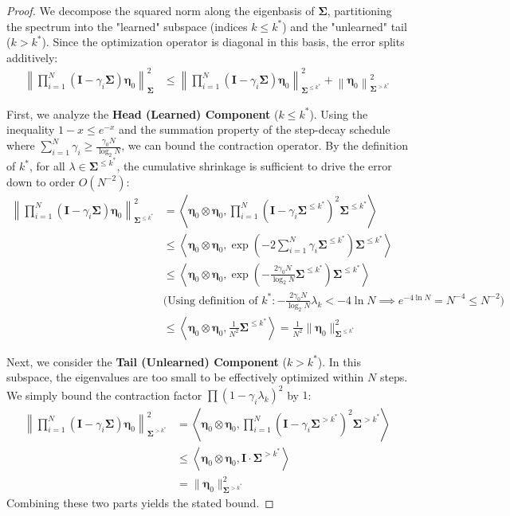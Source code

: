 \documentclass{article}
\theoremstyle{definition}
\theoremstyle{definition}
\theoremstyle{plain}
\theoremstyle{plain}
\theoremstyle{plain}
\theoremstyle{plain}
\theoremstyle{plain}
\newcommand{\bs}[1]{\boldsymbol{\mathbf{#1}}}
\newcommand{\Sig}{\mathbf{\Sigma}}
\newcommand{\id}{\mathbf{I}}
\newcommand{\nm}[2][]{\left\| #2 \right\|^2_{#1}}
\newcommand{\inner}[1]{\left\langle#1\right\rangle}
\begin{document}
\begin{proof}
    We decompose the squared norm along the eigenbasis of $\bs\Sigma$, partitioning the spectrum into the "learned" subspace (indices $k \le k^*$) and the "unlearned" tail ($k > k^*$). Since the optimization operator is diagonal in this basis, the error splits additively:
    \begin{equation}
    \begin{aligned}
        \nm[\Sig]{\prod_{i=1}^N(\id-\gamma_i\bs\Sigma)\bs\eta_0} &\leq \nm[\Sig^{\leq k^*}]{\prod_{i=1}^N(\id-\gamma_i\bs\Sigma)\bs\eta_0} + \nm[\Sig^{>k^*}]{\bs\eta_0}
    \end{aligned}
    \end{equation}

    First, we analyze the \textbf{Head (Learned) Component} ($k \leq k^*$). Using the inequality $1-x \le e^{-x}$ and the summation property of the step-decay schedule where $\sum_{i=1}^N \gamma_i \ge \frac{\gamma_0 N}{\log_2 N}$, we can bound the contraction operator. By the definition of $k^*$, for all $\lambda \in \Sig^{\le k^*}$, the cumulative shrinkage is sufficient to drive the error down to order $O(N^{-2})$:
    \begin{equation}
    \begin{aligned}
        \nm[\Sig^{\leq k^*}]{\prod_{i=1}^N(\id-\gamma_i\bs\Sigma)\bs\eta_0} &= \inner{\bs\eta_0\otimes\bs\eta_0,\prod_{i=1}^N(\id-\gamma_i\bs\Sigma^{\leq k^*})^2\bs\Sigma^{\leq k^*}}\\
        &\leq \inner{\bs\eta_0\otimes\bs\eta_0,\exp\left(-2\sum_{i=1}^N \gamma_i \bs\Sigma^{\leq k^*}\right)\bs\Sigma^{\leq k^*}}\\
        &\leq \inner{\bs\eta_0\otimes\bs\eta_0,\exp\left(-\frac{2\gamma_0 N}{\log_2 N} \bs\Sigma^{\leq k^*}\right)\bs\Sigma^{\leq k^*}}\\
        &\text{(Using definition of } k^*: -\frac{2\gamma_0 N}{\log_2 N} \lambda_k < -4 \ln N \implies e^{-4 \ln N} = N^{-4} \le N^{-2} \text{)} \\
        &\leq \inner{\bs\eta_0\otimes\bs\eta_0,\frac{1}{N^2}\bs\Sigma^{\leq k^*}} = \frac{1}{N^2}\|\bs\eta_0\|^2_{\Sig^{\leq k^*}}
    \end{aligned}
    \end{equation}

    Next, we consider the \textbf{Tail (Unlearned) Component} ($k > k^*$). In this subspace, the eigenvalues are too small to be effectively optimized within $N$ steps. We simply bound the contraction factor $\prod(1-\gamma_i \lambda_k)^2$ by $1$:
    \begin{equation}
    \begin{aligned}
        \nm[\Sig^{> k^*}]{\prod_{i=1}^N(\id-\gamma_i\bs\Sigma)\bs\eta_0} &= \inner{\bs\eta_0\otimes\bs\eta_0,\prod_{i=1}^N(\id-\gamma_i\bs\Sigma^{> k^*})^2\bs\Sigma^{> k^*}}\\
        &\leq \inner{\bs\eta_0\otimes\bs\eta_0, \bs I \cdot \bs\Sigma^{> k^*}} \\
        &= \|\bs\eta_0\|^2_{\Sig^{> k^*}}
    \end{aligned}
    \end{equation}
    Combining these two parts yields the stated bound.
\end{proof}
\end{document}
